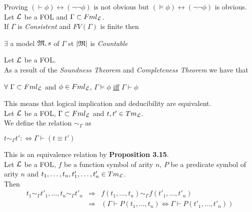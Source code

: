\documentclass[11pt,a4paper]{article}
\begin{document}
Proving $(\vdash\phi)\leftrightarrow(\neg\neg\phi)$ is not obvious but $(\vDash\phi)\leftrightarrow(\neg\neg\phi)$ is obvious.\\

Let $\mathcal{L}$ be a FOL and $\Gamma\subset Fml_{\mathcal{L}}$.\\
If $\Gamma$ is \textit{Consistent} and $FV(\Gamma)$ is finite then
\begin{center}
	$\exists$ a model $\mathfrak{M},s$ of $\Gamma$ st $|\mathfrak{M}|$ is \textit{Countable}
\end{center}

Let $\mathcal{L}$ be a FOL.\\
As a result of the \textit{Soundness Theorem} and \textit{Completeness Theorem} we have that
\begin{center}
$\forall\ \Gamma\subset Fml_{\mathcal{L}}$ and $\phi\in Fml_{\mathcal{L}}$, $\Gamma\vDash\phi$ \underline{iff} $\Gamma\vdash\phi$
\end{center}
This means that logical implication and deducibility are equivalent.\\

Let $\mathcal{L}$ be a FOL, $\Gamma\subset Fml_{\mathcal{L}}$ and $t,t'\in Tm_{\mathcal{L}}$.\\
We define the relation $\sim_\Gamma$ as
\begin{center}
	$t\sim_\Gamma t':\Leftrightarrow \Gamma\vdash (t\equiv t')$
\end{center}
\nb This is an equivalence relation by \textbf{Proposition 3.15}.\\

Let $\mathcal{L}$ be a FOL, $f$ be a function symbol of arity $n$, $P$ be a predicate symbol of arity $n$ and $t_1,\dots,t_n,t'_1,\dots,t'_n\in Tm_{\mathcal{L}}$.\\
Then
\[\begin{array}{rcl}
t_1\sim_\Gamma t'_1,\dots,t_n\sim_\Gamma t'_n&\Rightarrow&f(t_1,\dots,t_n)\sim_\Gamma f(t'_1,\dots,t'_n)\\
&\Rightarrow&(\Gamma\vdash P(t_1,\dots,t_n)\Leftrightarrow\Gamma\vdash P(t'_1,\dots,t'_n))
\end{array}\]
\end{document}
